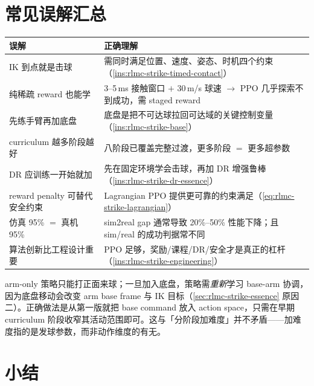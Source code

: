 \section*{常见误解汇总}
\label{sec:rlmc-strike-myths}

\begin{center}
\small
\begin{tabular}{@{}p{6.2cm}p{8.0cm}@{}}
\toprule
误解 & 正确理解 \\
\midrule
IK 到点就是击球 & 需同时满足位置、速度、姿态、时机四个约束（\cref{ins:rlmc-strike-timed-contact}） \\
纯稀疏 reward 也能学 & 3--5\,ms 接触窗口 $+$ 30\,m/s 球速 $\to$ PPO 几乎探索不到成功，需 staged reward \\
先练手臂再加底盘 & 底盘是把不可达球拉回可达域的关键控制变量（\cref{ins:rlmc-strike-base}） \\
curriculum 越多阶段越好 & 八阶段已覆盖完整过渡，更多阶段 $=$ 更多超参数 \\
DR 应训练一开始就加 & 先在固定环境学会击球，再加 DR 增强鲁棒（\cref{ins:rlmc-strike-dr-essence}） \\
reward penalty 可替代安全约束 & Lagrangian PPO 提供更可靠的约束满足（\cref{eq:rlmc-strike-lagrangian}） \\
仿真 95\% $=$ 真机 95\% & sim2real gap 通常导致 20\%--50\% 性能下降；且 sim/real 的成功判据常不同 \\
算法创新比工程设计重要 & PPO 足够，奖励/课程/DR/安全才是真正的杠杆（\cref{ins:rlmc-strike-engineering}） \\
\bottomrule
\end{tabular}
\end{center}

\begin{insight}\label{ins:rlmc-strike-armfirst}
arm-only 策略只能打正面来球；一旦加入底盘，策略需\emph{重新}学习 base-arm 协调，因为底盘移动会改变 arm base frame 与 IK 目标（\cref{sec:rlmc-strike-essence} 原因二）。正确做法是从第一版就把 base command 放入 action space，只需在早期 curriculum 阶段收窄其活动范围即可。这与「分阶段加难度」并不矛盾——加难度指的是发球参数，而非动作维度的有无。
\end{insight}

\section*{小结}
\label{sec:rlmc-strike-summary}

